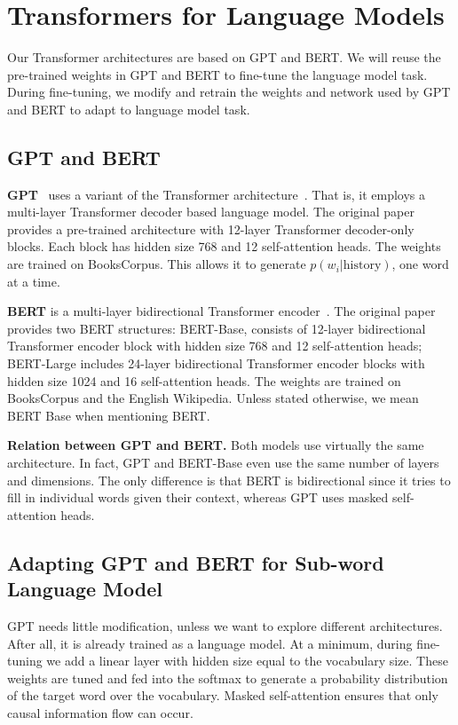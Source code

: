 \documentclass[11pt,a4paper]{article}
\begin{document}
 \section{Transformers for Language Models}
\label{sec:arch_for_language model}

Our Transformer architectures are based on GPT and BERT. We will reuse the pre-trained weights in GPT and BERT to fine-tune the language model task. During fine-tuning, we modify and retrain the weights and network used by GPT and BERT to adapt to language model task. 

\subsection{GPT and BERT}



{\bf GPT}~\cite{radford2018improving} uses a variant of the Transformer architecture~\cite{vaswani2017attention}. That is, it employs a multi-layer Transformer decoder based language model. The original paper provides a pre-trained architecture with 12-layer Transformer decoder-only blocks. Each block has hidden size 768 and 12 self-attention heads. The weights are trained  on BooksCorpus. This allows it to generate $p(w_i|\mathrm{history})$, one word at a time. 

{\bf BERT} is a multi-layer bidirectional Transformer encoder~\cite{devlin2018bert}. The original paper provides two BERT structures: {BERT-Base},  consists of 12-layer bidirectional Transformer encoder block with hidden size 768 and 12 self-attention heads; {BERT-Large} includes 24-layer bidirectional Transformer encoder blocks with hidden size 1024 and 16 self-attention heads. The weights are trained on BooksCorpus and the English Wikipedia. 
Unless stated otherwise, we mean {BERT Base} when mentioning {BERT}.

{\bf Relation between GPT and BERT.} Both models use virtually the same architecture. In fact, GPT and BERT-Base even use the same number of layers and dimensions. The only difference is that BERT is bidirectional since it tries to fill in individual words given their context, whereas GPT uses masked self-attention heads.

\subsection{Adapting GPT and BERT for Sub-word Language Model}
\label{sec:adapt}

GPT needs little modification, unless we want to explore different architectures. After all, it is already trained as a language model. At a minimum, during fine-tuning we add a linear layer with hidden size equal to the vocabulary size. These weights are tuned and fed into the softmax to generate a probability distribution of the target word over the vocabulary. Masked self-attention ensures that only causal information flow can occur. 
\end{document}
